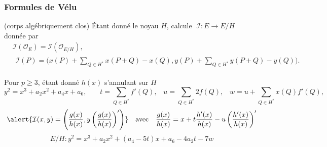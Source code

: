 \documentclass[10pt]{beamer}
\renewcommand{\ge}{\geqslant}  %
\newcommand{\0}{\mathcal{O}}  %
\newcommand{\isog}[1]{\mathcal{#1}}  %
\newcommand{\I}{\isog{I}}  %
\begin{document}
\begin{frame}
  \frametitle{Formules de Vélu}
  
  \begin{block}{\cite{velu71} (corps algébriquement clos)}
    Étant donné le noyau $H$, calcule $\;\I : E\to E/H\;$ donnée par 
    \begin{align*}
      &\I(\0_E) = \I(\0_{E/H})\text{,}\\
      &\begin{aligned}
        \I(P) = \Biggl(x(P) + \sum_{Q\in H^\ast}x(P+Q) - x(Q),
        y(P) + \sum_{Q\in H^\ast}y(P+Q) - y(Q) \Biggr) \text{.}
      \end{aligned}
    \end{align*}
  \end{block}

  \begin{block}{Pour $p\ge 3$, étant donné $h(x)$ s'annulant sur $H$}
    {\footnotesize
      \[
      y^2 = x^3 + a_2x^2 + a_4x + a_6\text{,}
      \qquad
      t = \sum_{Q\in H^\ast} f'(Q)\text{,}
      \quad
      u = \sum_{Q\in H^\ast} 2f(Q)\text{,}
      \quad
      w = u + \sum_{Q\in H^\ast} x(Q)f'(Q)\text{,}\]}
    \[\alert{\I(x,y) = \left(\frac{g(x)}{h(x)}, y\left(\frac{g(x)}{h(x)}\right)'\right)}
    \quad\text{avec}\quad
    \frac{g(x)}{h(x)} = x + t\frac{h'(x)}{h(x)} - u\left(\frac{h'(x)}{h(x)}\right)'\]
    \[E/H : y^2 = x^3 + a_2x^2 + (a_4 - 5t)x + a_6 - 4a_2t - 7w\]
  \end{block}
\end{frame}

\end{document}
